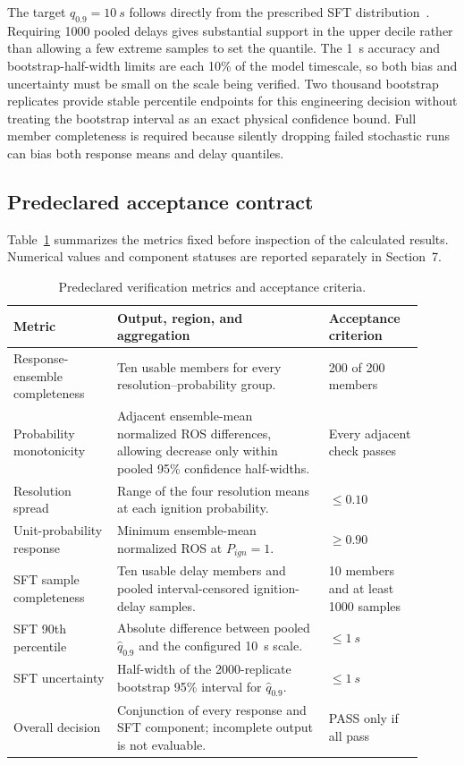 The target \(q_{0.9}=\SI{10}{s}\) follows directly from the prescribed SFT
distribution~\cite{Qin2025}.  Requiring 1000 pooled delays gives substantial
support in the upper decile rather than allowing a few extreme samples to set
the quantile.  The \SI{1}{s} accuracy and bootstrap-half-width limits are each
10\% of the model timescale, so both bias and uncertainty must be small on the
scale being verified.  Two thousand bootstrap replicates provide stable
percentile endpoints for this engineering decision without treating the
bootstrap interval as an exact physical confidence bound.  Full member
completeness is required because silently dropping failed stochastic runs can
bias both response means and delay quantiles.

\subsection{Predeclared acceptance contract}

Table~\ref{tab:acceptance-contract} summarizes the metrics fixed before
inspection of the calculated results. Numerical values and component statuses
are reported separately in Section~7.

\begin{table}[H]
\centering
\footnotesize
\caption{Predeclared verification metrics and acceptance criteria.}
\label{tab:acceptance-contract}
\begin{tabular}{@{}p{0.23\linewidth}p{0.47\linewidth}p{0.21\linewidth}@{}}
\toprule
Metric & Output, region, and aggregation & Acceptance criterion\\
\midrule
Response-ensemble completeness & Ten usable members for every resolution--probability group. & 200 of 200 members \\
Probability monotonicity & Adjacent ensemble-mean normalized ROS differences, allowing decrease only within pooled 95\% confidence half-widths. & Every adjacent check passes \\
Resolution spread & Range of the four resolution means at each ignition probability. & \(\le0.10\) \\
Unit-probability response & Minimum ensemble-mean normalized ROS at \(P_{ign}=1\). & \(\ge0.90\) \\
SFT sample completeness & Ten usable delay members and pooled interval-censored ignition-delay samples. & 10 members and at least 1000 samples \\
SFT 90th percentile & Absolute difference between pooled \(\widehat q_{0.9}\) and the configured \SI{10}{s} scale. & \(\le\SI{1}{s}\) \\
SFT uncertainty & Half-width of the 2000-replicate bootstrap 95\% interval for \(\widehat q_{0.9}\). & \(\le\SI{1}{s}\) \\
Overall decision & Conjunction of every response and SFT component; incomplete output is not evaluable. & PASS only if all pass \\
\bottomrule
\end{tabular}
\end{table}

